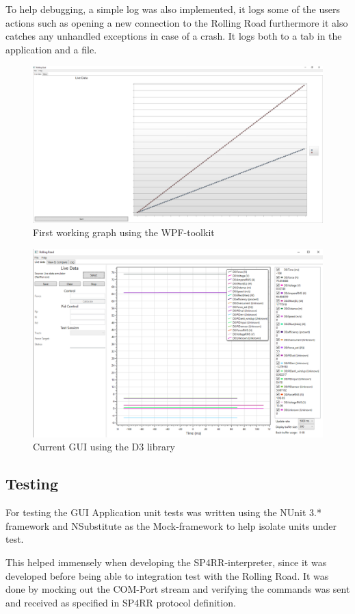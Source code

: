 
To help debugging, a simple log was also implemented, it logs some of the users actions such as opening a new connection to the Rolling Road furthermore it also catches any unhandled exceptions in case of a crash. It logs both to a tab in the application and a file.

\begin{figure}[h!]
\centering
\includegraphics[width=0.7\linewidth]{SubPages/Images/First_GUI}
\caption{First working graph using the WPF-toolkit}
\label{fig:First_GUI}
\end{figure}

\begin{figure}[h!]
\centering
\includegraphics[width=0.7\linewidth]{SubPages/Images/Current_GUI}
\caption{Current GUI using the D3 library}
\label{fig:Current_GUI}
\end{figure}


\subsection{Testing}
For testing the GUI Application unit tests was written using the NUnit 3.* framework and NSubstitute as the Mock-framework to help isolate units under test.

This helped immensely when developing the SP4RR-interpreter, since it was developed before being able to integration test with the Rolling Road. It was done by mocking out the COM-Port stream and verifying the commands was sent and received as specified in SP4RR  protocol definition\cite{RR}.

